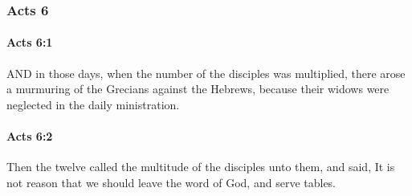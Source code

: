 	\subsubsection{Acts 6} %
		\label{ACTS-6}
		
		\paragraph{Acts 6:1} %
			\label{ACTS-6-1}

			AND in those days, when the number of the disciples was multiplied, there arose a murmuring of the Grecians against the Hebrews, because their widows were neglected in the daily ministration.

			\begin{framed}
			\scriptsize
				\begin{compactdesc}
					\item[SBLG] 
				\end{compactdesc}
			\end{framed}

		\paragraph{Acts 6:2} %
			\label{ACTS-6-2}

			Then the twelve called the multitude of the disciples unto them, and said, It is not reason that we should leave the word of God, and serve tables.

